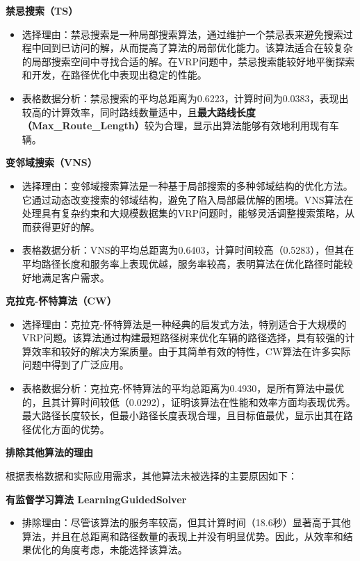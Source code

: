 \documentclass[12pt,a4paper,twoside]{ctexbook}
\begin{document}
\textbf{禁忌搜索（TS）}

\begin{itemize}
    \item 选择理由：禁忌搜索是一种局部搜索算法，通过维护一个禁忌表来避免搜索过程中回到已访问的解，从而提高了算法的局部优化能力。该算法适合在较复杂的局部搜索空间中寻找合适的解。在VRP问题中，禁忌搜索能较好地平衡探索和开发，在路径优化中表现出稳定的性能。
    \item 表格数据分析：禁忌搜索的平均总距离为0.6223，计算时间为0.0383，表现出较高的计算效率，同时路线数量适中，且\textbf{最大路线长度（Max\_Route\_Length）}较为合理，显示出算法能够有效地利用现有车辆。
\end{itemize}

\textbf{变邻域搜索（VNS）}

\begin{itemize}
    \item 选择理由：变邻域搜索算法是一种基于局部搜索的多种邻域结构的优化方法。它通过动态改变搜索的邻域结构，避免了陷入局部最优解的困境。VNS算法在处理具有复杂约束和大规模数据集的VRP问题时，能够灵活调整搜索策略，从而获得更好的解。
    \item 表格数据分析：VNS的平均总距离为0.6403，计算时间较高（0.5283），但其在平均路径长度和服务率上表现优越，服务率较高，表明算法在优化路径时能较好地满足客户需求。
\end{itemize}

\textbf{克拉克-怀特算法（CW）}

\begin{itemize}
    \item 选择理由：克拉克-怀特算法是一种经典的启发式方法，特别适合于大规模的VRP问题。该算法通过构建最短路径树来优化车辆的路径选择，具有较强的计算效率和较好的解决方案质量。由于其简单有效的特性，CW算法在许多实际问题中得到了广泛应用。
    \item 表格数据分析：克拉克-怀特算法的平均总距离为0.4930，是所有算法中最优的，且其计算时间较低（0.0292），证明该算法在性能和效率方面均表现优秀。最大路径长度较长，但最小路径长度表现合理，且目标值最优，显示出其在路径优化方面的优势。
\end{itemize}

\textbf{排除其他算法的理由}

根据表格数据和实际应用需求，其他算法未被选择的主要原因如下：

\textbf{有监督学习算法 LearningGuidedSolver}

\begin{itemize}
    \item 排除理由：尽管该算法的服务率较高，但其计算时间（18.6秒）显著高于其他算法，并且在总距离和路径数量的表现上并没有明显优势。因此，从效率和结果优化的角度考虑，未能选择该算法。
\end{itemize}
\end{document}
